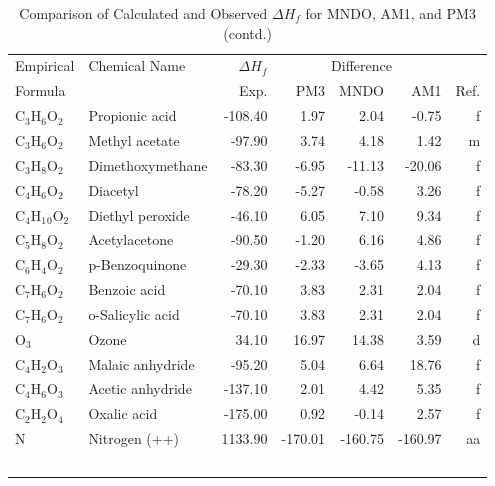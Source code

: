 \begin{table}
\caption{Comparison of Calculated and Observed $\Delta H_f$ 
for MNDO, AM1, and PM3 (contd.)}
\begin{center}
\compresstable
\begin{tabular}{llrrrrr}
Empirical & Chemical Name & $\Delta H_f$ & \multicolumn{3}{c}{Difference} & \\
Formula   &               & Exp. & PM3 &  MNDO  &  AM1 &     Ref.\\
\hline
 C$_3$H$_6$O$_2$      & Propionic acid                  &  -108.40    &     1.97  &     2.04  &    -0.75  &      f\\
 C$_3$H$_6$O$_2$      & Methyl acetate                  &   -97.90    &     3.74  &     4.18  &     1.42  &      m\\
 C$_3$H$_8$O$_2$      & Dimethoxymethane                &   -83.30    &    -6.95  &   -11.13  &   -20.06  &      f\\
 C$_4$H$_6$O$_2$      & Diacetyl                        &   -78.20    &    -5.27  &    -0.58  &     3.26  &      f\\
 C$_4$H$_1$$_0$O$_2$     & Diethyl peroxide                &   -46.10    &     6.05  &     7.10  &     9.34  &      f\\
 C$_5$H$_8$O$_2$      & Acetylacetone                   &   -90.50    &    -1.20  &     6.16  &     4.86  &      f\\
 C$_6$H$_4$O$_2$      & p-Benzoquinone                  &   -29.30    &    -2.33  &    -3.65  &     4.13  &      f\\
 C$_7$H$_6$O$_2$      & Benzoic acid                    &   -70.10    &     3.83  &     2.31  &     2.04  &      f\\
 C$_7$H$_6$O$_2$      & o-Salicylic acid                &   -70.10    &     3.83  &     2.31  &     2.04  &      f\\
 O$_3$          & Ozone                           &    34.10    &    16.97  &    14.38  &     3.59  &      d\\
 C$_4$H$_2$O$_3$      & Malaic anhydride                &   -95.20    &     5.04  &     6.64  &    18.76  &      f\\
 C$_4$H$_6$O$_3$      & Acetic anhydride                &  -137.10    &     2.01  &     4.42  &     5.35  &      f\\
 C$_2$H$_2$O$_4$      & Oxalic acid                     &  -175.00    &     0.92  &    -0.14  &     2.57  &      f\\
 N           & Nitrogen (++)                   &  1133.90    &  -170.01  &  -160.75  &  -160.97  &     aa\\
$$
\end{tabular}
\end{center}
\end{table}
